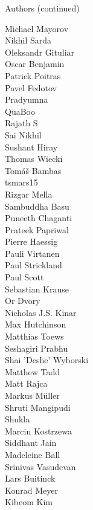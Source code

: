 \documentclass[xcolor=svgnames]{beamer}
\begin{document}
\begin{frame}{Authors (continued)}
\begin{multicols}{5}
        Michael Mayorov\\
        Nikhil Sarda\\
        Oleksandr Gituliar\\
        Oscar Benjamin\\
        Patrick Poitras\\
        Pavel Fedotov\\
        Pradyumna\\
        QuaBoo\\
        Rajath S\\
        Sai Nikhil\\
        Sushant Hiray\\
        Thomas Wiecki\\
        Tomáš Bambas\\
        tsmars15\\
        Rizgar Mella\\
        Sambuddha Basu\\
        Puneeth Chaganti\\
        Prateek Papriwal\\
        Pierre Haessig\\
        Pauli Virtanen\\
        Paul Strickland\\
        Paul Scott\\
        Sebastian Krause\\
        Or Dvory\\
        Nicholas J.S. Kinar\\
        Max Hutchinson\\
        Matthias Toews\\
        Seshagiri Prabhu\\
        Shai 'Deshe' Wyborski\\
        Matthew Tadd\\
        Matt Rajca\\
        Markus Müller\\
        Shruti Mangipudi\\
        Shukla\\
        Marcin Kostrzewa\\
        Siddhant Jain\\
        Madeleine Ball\\
        Srinivas Vasudevan\\
        Lars Buitinck\\
        Konrad Meyer\\
        Kibeom Kim\\

\end{multicols}
\end{frame}
\end{document}
